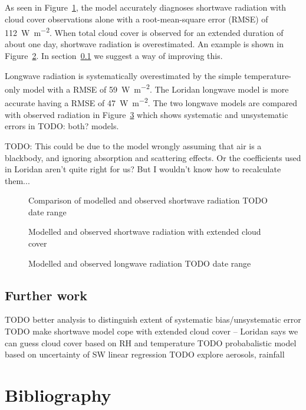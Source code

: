 \documentclass[a4paper,titlepage]{article}
\begin{document}
As seen in Figure~\ref{fig:shortwave-verification}, the model accurately diagnoses shortwave radiation with cloud cover observations alone with a root-mean-square error (RMSE) of \SI{112}{\watt\per\meter\squared}.  When total cloud cover is observed for an extended duration of about one day, shortwave radiation is overestimated.  An example is shown in Figure~\ref{fig:extended-cloud}.  In section~\ref{sec:further-work} we suggest a way of improving this.

Longwave radiation is systematically overestimated by the simple temperature-only model with a RMSE of \SI{59}{\watt\per\meter\squared}.  The Loridan longwave model is more accurate having a RMSE of \SI{47}{\watt\per\meter\squared}.  The two longwave models are compared with observed radiation in Figure~\ref{fig:longwave-verification} which shows systematic and unsystematic errors in TODO: both? models.

TODO: This could be due to the model wrongly assuming that air is a blackbody, and ignoring absorption and scattering effects.  Or the coefficients used in Loridan aren't quite right for us?  But I wouldn't know how to recalculate them...
\begin {figure}
\centering

\caption{Comparison of modelled and observed shortwave radiation TODO date range}
\label{fig:shortwave-verification}
\end{figure}

\begin{figure}
\centering

\caption{Modelled and observed shortwave radiation with extended cloud cover}
\label{fig:extended-cloud}
\end{figure}

\begin{figure}
\centering

\caption{Modelled and observed longwave radiation TODO date range}
\label{fig:longwave-verification}
\end{figure}

\subsection{Further work}
\label{sec:further-work}
TODO better analysis to distinguish extent of systematic bias/unsystematic error
TODO make shortwave model cope with extended cloud cover -- Loridan says we can guess cloud cover based on RH and temperature
TODO probabalistic model based on uncertainty of SW linear regression
TODO explore aerosols, rainfall

\section{Bibliography}
\printbibliography
\end{document}
